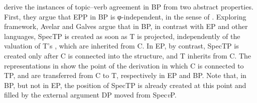 \documentclass[output=paper]{langsci/langscibook}
\begin{document}
\textcite{AvelarGalves2011,AvelarGalves2016} derive the instances of
topic--verb agreement in \gls{BP} from two
abstract properties. First, they argue that \gls{EPP} in \gls{BP} is
φ-in\-de\-pen\-dent, in the sense of \citet{Holmberg2010}. Exploring
 framework, Avelar and Galves argue that in BP, in
contrast with \gls{EP} and other  languages, SpecTP is created as soon
as T is projected, independently of the valuation of T’s , which are
inherited from C. In EP, by contrast, SpecTP is created only after C is
connected into the structure, and T inherits  from C.  The
representations in  show
the point of the derivation in which C is connected to TP, and  are
transferred from C to T, respectively in \gls{EP} and BP.  Note that, in BP,
but not in EP, the position of SpecTP is already created at this point and
filled by the external argument DP moved from Spec\emph{v}P.
\end{document}
